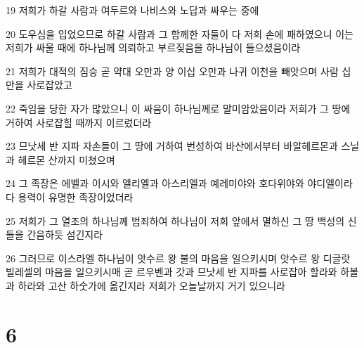 \par 19 저희가 하갈 사람과 여두르와 나비스와 노답과 싸우는 중에
\par 20 도우심을 입었으므로 하갈 사람과 그 함께한 자들이 다 저희 손에 패하였으니 이는 저희가 싸울 때에 하나님께 의뢰하고 부르짖음을 하나님이 들으셨음이라
\par 21 저희가 대적의 짐승 곧 약대 오만과 양 이십 오만과 나귀 이천을 빼앗으며 사람 십만을 사로잡았고
\par 22 죽임을 당한 자가 많았으니 이 싸움이 하나님께로 말미암았음이라 저희가 그 땅에 거하여 사로잡힐 때까지 이르렀더라
\par 23 므낫세 반 지파 자손들이 그 땅에 거하여 번성하여 바산에서부터 바알헤르몬과 스닐과 헤르몬 산까지 미쳤으며
\par 24 그 족장은 에벨과 이시와 엘리엘과 아스리엘과 예레미야와 호다위야와 야디엘이라 다 용력이 유명한 족장이었더라
\par 25 저희가 그 열조의 하나님께 범죄하여 하나님이 저희 앞에서 멸하신 그 땅 백성의 신들을 간음하듯 섬긴지라
\par 26 그러므로 이스라엘 하나님이 앗수르 왕 불의 마음을 일으키시며 앗수르 왕 디글랏 빌레셀의 마음을 일으키시매 곧 르우벤과 갓과 므낫세 반 지파를 사로잡아 할라와 하볼과 하라와 고산 하숫가에 옮긴지라 저희가 오늘날까지 거기 있으니라

\chapter{6}

